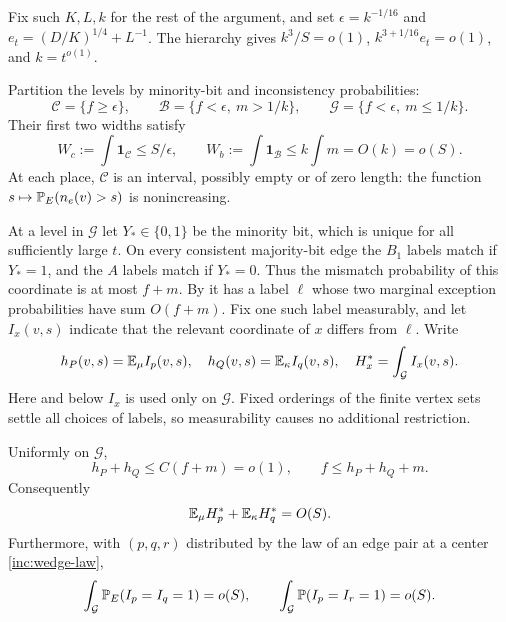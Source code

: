 Fix such $K,L,k$ for the rest of the argument, and set
$\epsilon=k^{-1/16}$ and $e_t=(D/K)^{1/4}+L^{-1}$.
The hierarchy gives $k^3/S=o(1)$, $k^{3+1/16}e_t=o(1)$, and
$k=t^{o(1)}$.

Partition the levels by minority-bit and inconsistency probabilities:
\[
 \mathcal C=\{f\ge\epsilon\},\qquad
 \mathcal B=\{f<\epsilon,\ m>1/k\},\qquad
 \mathcal G=\{f<\epsilon,\ m\le1/k\}.
\]
Their first two widths satisfy
\begin{equation}\label{bud:widths}
 W_c:=\int\mathbf1_{\mathcal C}\le S/\epsilon,
 \qquad W_b:=\int\mathbf1_{\mathcal B}\le k\int m=O(k)=o(S).
\end{equation}
At each place, $\mathcal C$ is an interval, possibly empty or of zero
length: the function $s\mapsto\mathbb P_E(n_e(v)>s)$ is nonincreasing.

At a level in $\mathcal G$ let $Y_\ast\in\{0,1\}$ be the minority bit, which is
unique for all sufficiently large $t$.  On every consistent
majority-bit edge the $B_1$ labels match if $Y_\ast=1$, and the $A$ labels
match if $Y_\ast=0$.  Thus the mismatch probability of this coordinate is
at most $f+m$.  By  it has a label $\ell$ whose two
marginal exception probabilities have sum $O(f+m)$.  Fix one such
label measurably, and let $I_x(v,s)$ indicate that the relevant
coordinate of $x$ differs from $\ell$.  Write
\[
 h_P(v,s)=\mathbb E_\mu I_p(v,s),\quad
 h_Q(v,s)=\mathbb E_\kappa I_q(v,s),\quad
 H_x^*=\int_{\mathcal G} I_x(v,s).
\]
Here and below $I_x$ is used only on $\mathcal G$.  Fixed orderings of
the finite vertex sets settle all choices of labels, so measurability
causes no additional restriction.

\begin{lemma}\label{bud:rare-moments}
Uniformly on $\mathcal G$,
\begin{equation}\label{bud:exception-comparison}
 h_P+h_Q\le C(f+m)=o(1),\qquad f\le h_P+h_Q+m.
\end{equation}
Consequently
\begin{equation}\label{bud:first-moments}
 \mathbb E_\mu H_p^*+\mathbb E_\kappa H_q^*=O(S).
\end{equation}
Furthermore, with $(p,q,r)$ distributed by the law of an edge pair at a center \eqref{inc:wedge-law},
\begin{equation}\label{bud:joint-exceptions}
 \int_{\mathcal G}\mathbb P_E(I_p=I_q=1)=o(S),\qquad
 \int_{\mathcal G}\mathbb P(I_p=I_r=1)=o(S).
\end{equation}
\end{lemma}

